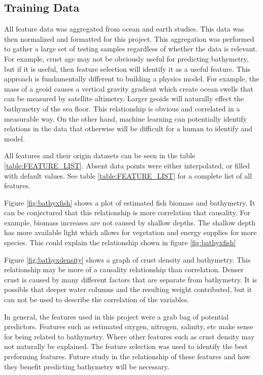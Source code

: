 \subsection{Training Data}
All feature data was aggregated from ocean and earth studies.
This data was then normalized and formatted for this project.
This aggregation was performed to gather a large set of testing samples regardless of whether the data is relevant.
For example, crust age may not be obviously useful for predicting bathymetry, but if it is useful, then feature selection will identify it as a useful feature.
This approach is fundamentally different to building a physics model.
For example, the mass of a geoid causes a vertical gravity gradient which create ocean swells that can be measured by satellite altimetry.
Larger geoids will naturally effect the bathymetry of the sea floor.
This relationship is obvious and correlated in a measurable way.
On the other hand, machine learning can potentially identify relations in the data that otherwise will be difficult for a human to identify and model.

All features and their origin datasets can be seen in the table \ref{table:FEATURE_LIST}. %
Absent data points were either interpolated, or filled with default values.
See table \ref{table:FEATURE_LIST} for a complete list of all features.

\par
Figure \ref{fig:bathyxfish} shows a plot of estimated fish biomass and bathymetry.
It can be conjectured that this relationship is more correlation that causality.
For example, biomass increases are not caused by shallow depths.
The shallow depth has more available light which allows for vegetation and energy supplies for more species.
This could explain the relationship shown in figure \ref{fig:bathyxfish}

\par
Figure \ref{fig:bathyxdensity} shows a graph of crust density and bathymetry.
This relationship may be more of a causality relationship than correlation.
Denser crust is caused by many different factors that are separate from bathymetry.
It is possible that deeper water columns and the resulting weight contributed, but it can not be used to describe the correlation of the variables.

\par
In general, the features used in this project were a grab bag of potential predictors.
Features such as estimated oxygen, nitrogen, salinity, etc make sense for being related to bathymetry.
Where other features such as crust density may not naturally be explained.
The feature selection was used to identify the best preforming features.
Future study in the relationship of these features and how they benefit predicting bathymetry will be necessary.



